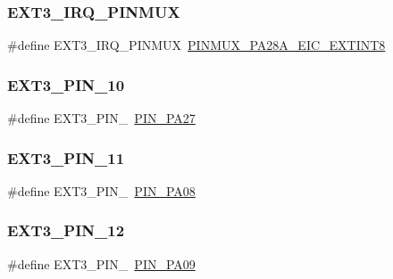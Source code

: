 \mbox{\label{group__samd21__xplained__pro__features__group_ga8706ccc826eb7e13e73095dc982777d8}} 
\subsubsection{\texorpdfstring{EXT3\_IRQ\_PINMUX}{EXT3\_IRQ\_PINMUX}}
{\footnotesize\ttfamily \#define E\+X\+T3\+\_\+\+I\+R\+Q\+\_\+\+P\+I\+N\+M\+UX~\mbox{\hyperlink{pio_2samd21j18a_8h_a24a0ae672e2c6a4666ac95a58cc5f4f1}{P\+I\+N\+M\+U\+X\+\_\+\+P\+A28\+A\+\_\+\+E\+I\+C\+\_\+\+E\+X\+T\+I\+N\+T8}}}

\mbox{\label{group__samd21__xplained__pro__features__group_ga4724c7144bc67a5615924e8c118d1831}} 
\subsubsection{\texorpdfstring{EXT3\_PIN\_10}{EXT3\_PIN\_10}}
{\footnotesize\ttfamily \#define E\+X\+T3\+\_\+\+P\+I\+N\+\_~\mbox{\hyperlink{pio_2samd21j18a_8h_a3794cc9242203d349103ba1249e5d587}{P\+I\+N\+\_\+\+P\+A27}}}

\mbox{\label{group__samd21__xplained__pro__features__group_ga3ff8ac1a1d17200f4cc8ca790dfb3f06}} 
\subsubsection{\texorpdfstring{EXT3\_PIN\_11}{EXT3\_PIN\_11}}
{\footnotesize\ttfamily \#define E\+X\+T3\+\_\+\+P\+I\+N\+\_~\mbox{\hyperlink{pio_2samd21j18a_8h_a7dc08bf81d9967156de18aae2cb5fe46}{P\+I\+N\+\_\+\+P\+A08}}}

\mbox{\label{group__samd21__xplained__pro__features__group_ga7797b0ce37f1f164fbd83a7c28e85e2a}} 
\subsubsection{\texorpdfstring{EXT3\_PIN\_12}{EXT3\_PIN\_12}}
{\footnotesize\ttfamily \#define E\+X\+T3\+\_\+\+P\+I\+N\+\_~\mbox{\hyperlink{pio_2samd21j18a_8h_ac14663d14647a4a629d8dc37616bf7e4}{P\+I\+N\+\_\+\+P\+A09}}}

